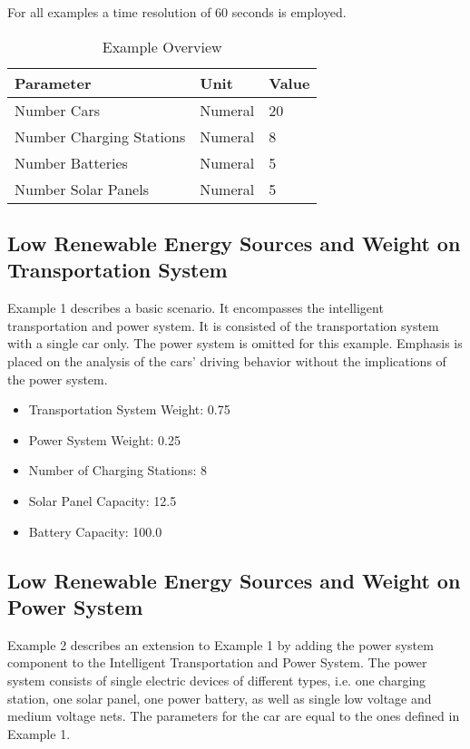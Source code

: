 For all examples a time resolution of 60 seconds is employed.

\begin{table}[h]
	\renewcommand{\arraystretch}{1.3}
	\caption{Example Overview}
	\centering
	\begin{tabular}{lll}
		\hline
		\textbf{Parameter}                    & \textbf{Unit}    & \textbf{Value} \\ \hline
		Number Cars                     	  & Numeral         & 20 \\
		Number Charging Stations              & Numeral         & 8 \\
		Number Batteries                      & Numeral         & 5 \\
		Number Solar Panels                   & Numeral         & 5 \\
	\end{tabular}
\end{table}

\subsection{Low Renewable Energy Sources and Weight on Transportation System}
Example 1 describes a basic scenario. It encompasses the intelligent transportation and power system. It is consisted of the transportation system with a single car only. The power system is omitted for this example.
Emphasis is placed on the analysis of the cars' driving behavior without the implications of the power system. 

\begin{itemize}  
	\item Transportation System Weight: 0.75
	\item Power System Weight: 0.25
	\item Number of Charging Stations: 8
	\item Solar Panel Capacity: 12.5
	\item Battery Capacity: 100.0
\end{itemize}

\subsection{Low Renewable Energy Sources and Weight on Power System}
Example 2 describes an extension to Example 1 by adding the power system component to the Intelligent Transportation and Power System. The power system consists of single electric devices of different types, i.e. one charging station, one solar panel, one power battery, as well as single low voltage and medium voltage nets. The parameters for the car are equal to the ones defined in Example 1.

